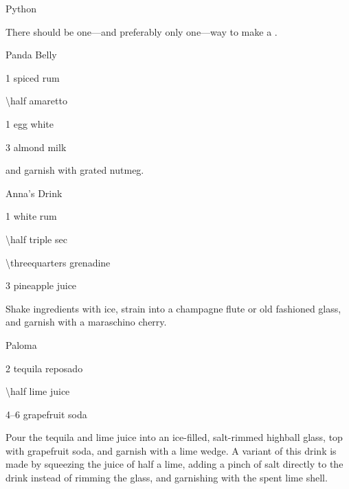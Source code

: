 \begin{Cocktail*}{Python}
	\begin{Ingredients}
	\item
	\end{Ingredients}
	
	\begin{Instructions}
	There should be one---and preferably only one---way to make a .
	\end{Instructions}
\end{Cocktail*}

\begin{Cocktail*}{Panda Belly}
	\begin{Ingredients}
	\item \SI{1}{\oz} spiced rum
	\item \SI{\half}{\oz} amaretto
	\item 1 egg white
	\item \SI{3}{\oz} almond milk
	\end{Ingredients}
	
	\begin{Instructions}
	and garnish with grated nutmeg.
	\end{Instructions}
\end{Cocktail*}

\begin{Cocktail*}{Anna's Drink}
	\begin{Ingredients}
	\item \SI{1}{\oz} white rum
	\item \SI{\half}{\oz} triple sec
	\item \SI{\threequarters}{\oz} grenadine
	\item \SI{3}{\oz} pineapple juice
	\end{Ingredients}
	
	\begin{Instructions}
	Shake ingredients with ice, strain into a champagne flute or old fashioned glass, and garnish with a maraschino cherry.
	\end{Instructions}
\end{Cocktail*}

\begin{Cocktail}{Paloma}
	\begin{Ingredients}
	\item \SI{2}{\oz} tequila reposado
	\item \SI{\half}{\oz} lime juice
	\item \SIrange{4}{6}{\oz} grapefruit soda
	\end{Ingredients}
	
	\begin{Instructions}
	Pour the tequila and lime juice into an ice-filled, salt-rimmed highball glass, top with grapefruit soda, and garnish with a lime wedge.  A variant of this drink is made by squeezing the juice of half a lime, adding a pinch of salt directly to the drink instead of rimming the glass, and garnishing with the spent lime shell.
	\end{Instructions}
\end{Cocktail}

